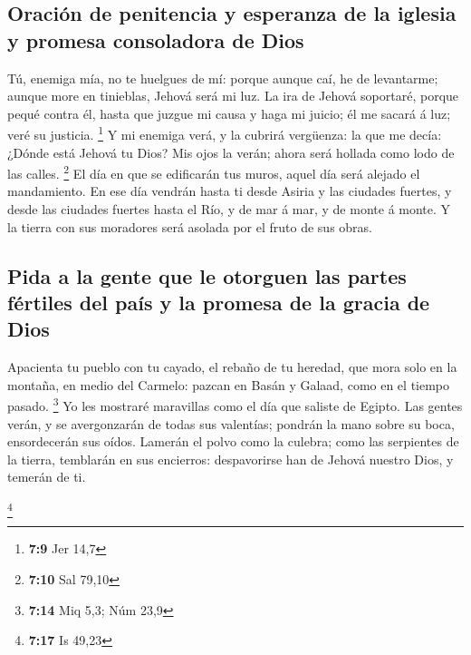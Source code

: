 \hypertarget{oraciuxf3n-de-penitencia-y-esperanza-de-la-iglesia-y-promesa-consoladora-de-dios}{%
\subsection{Oración de penitencia y esperanza de la iglesia y promesa
consoladora de
Dios}\label{oraciuxf3n-de-penitencia-y-esperanza-de-la-iglesia-y-promesa-consoladora-de-dios}}

 Tú, enemiga mía, no te huelgues de mí: porque aunque caí,
he de levantarme; aunque more en tinieblas, Jehová será mi luz.
 La ira de Jehová soportaré, porque pequé contra él, hasta
que juzgue mi causa y haga mi juicio; él me sacará á luz; veré su
justicia. \footnote{\textbf{7:9} Jer 14,7}  Y mi enemiga
verá, y la cubrirá vergüenza: la que me decía: ¿Dónde está Jehová tu
Dios? Mis ojos la verán; ahora será hollada como lodo de las calles.
\footnote{\textbf{7:10} Sal 79,10}  El día en que se
edificarán tus muros, aquel día será alejado el mandamiento.
 En ese día vendrán hasta ti desde Asiria y las ciudades
fuertes, y desde las ciudades fuertes hasta el Río, y de mar á mar, y de
monte á monte.  Y la tierra con sus moradores será
asolada por el fruto de sus obras.

\hypertarget{pida-a-la-gente-que-le-otorguen-las-partes-fuxe9rtiles-del-pauxeds-y-la-promesa-de-la-gracia-de-dios}{%
\subsection{Pida a la gente que le otorguen las partes fértiles del país
y la promesa de la gracia de
Dios}\label{pida-a-la-gente-que-le-otorguen-las-partes-fuxe9rtiles-del-pauxeds-y-la-promesa-de-la-gracia-de-dios}}

 Apacienta tu pueblo con tu cayado, el rebaño de tu
heredad, que mora solo en la montaña, en medio del Carmelo: pazcan en
Basán y Galaad, como en el tiempo pasado. \footnote{\textbf{7:14} Miq
  5,3; Núm 23,9}  Yo les mostraré maravillas como el día
que saliste de Egipto.  Las gentes verán, y se
avergonzarán de todas sus valentías; pondrán la mano sobre su boca,
ensordecerán sus oídos.  Lamerán el polvo como la
culebra; como las serpientes de la tierra, temblarán en sus encierros:
despavorirse han de Jehová nuestro Dios, y temerán de ti.

\footnote{\textbf{7:17} Is 49,23}

